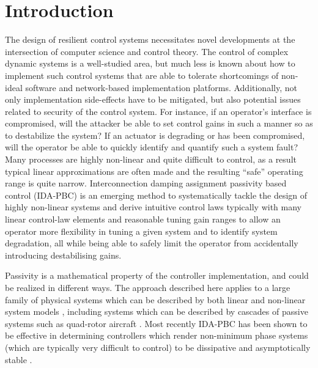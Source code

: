 \section{Introduction}
\label{S:introduction}
The design of resilient control systems necessitates novel developments at the 
intersection of computer science and control theory.  The control of complex 
dynamic systems is a well-studied area, but much less is known about how to 
implement such control systems that are able to tolerate shortcomings of 
non-ideal software and network-based implementation platforms. Additionally, 
not 
only implementation side-effects have to be mitigated, but 
also potential issues related to security of the control system. For instance, 
if an operator's interface is compromised, will the attacker be able to
set control gains in such a manner so as to destabilize the system?
If an actuator is degrading or has been compromised, will the operator
be able to quickly identify and quantify such a system fault?
Many processes are highly non-linear and quite difficult to control,
as a result typical linear approximations are often made and the
resulting ``safe'' operating range is quite narrow.  Interconnection
damping assignment passivity based control (IDA-PBC) is an emerging
method to systematically tackle the design of highly non-linear
systems and derive intuitive control laws typically with many linear
control-law elements and reasonable tuning gain ranges to allow an
operator more flexibility in tuning a given system and to identify system
degradation, all while being able to safely limit the operator from
accidentally introducing destabilising gains.

Passivity is a mathematical property of the controller implementation, and 
could be realized in different ways. The approach described here applies to a 
large family of physical systems  which can be described by both linear and 
non-linear system models
\cite{haddad08:_nonlin_dynam_system_and_contr,
  schaft99:_l2_gain_passiv_nonlin_contr,
  ortega98:_passiv_based_contr_euler_lagran_system}, including
systems which can be described by cascades of passive systems such as
quad-rotor aircraft
\cite{kottenstette09:_digit_passiv_attit_and_altit}.  Most recently
IDA-PBC has been shown to be effective in determining controllers which
render non-minimum phase systems (which are typically very difficult
to control) to be dissipative and asymptotically stable  
\cite{doerfler09:_introd_to_inter_and_dampin, ramirez09:_contr_of_non_linear_proces}.

